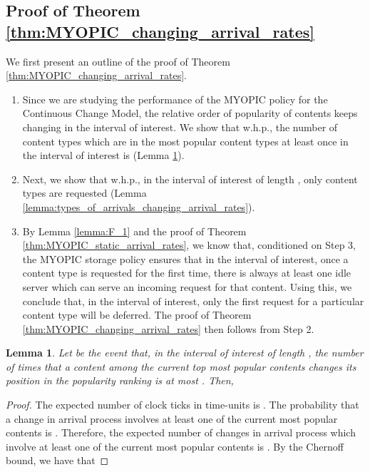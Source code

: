\documentclass[10pt, conference, letterpaper]{IEEEtran}
\newtheorem{lemma}{Lemma}
\begin{document}
\subsection{Proof of Theorem \ref{thm:MYOPIC_changing_arrival_rates}}
\label{sec:proof4}

\noindent We first present an outline of the proof of Theorem \ref{thm:MYOPIC_changing_arrival_rates}. 

\begin{enumerate}
	\item Since we are studying the performance of the MYOPIC policy for the Continuous Change Model, the relative order of popularity of contents keeps changing in the interval of interest. We show that w.h.p., the number of content types which are in the  most popular content types at least once in the interval of interest is  (Lemma \ref{lemma:change_in_heavy_hitters}).
	\item Next, we show that w.h.p., in the interval of interest of length , only  content types are requested (Lemma \ref{lemma:types_of_arrivals_changing_arrival_rates}).
	\item By Lemma \ref{lemma:F_1} and the proof of Theorem \ref{thm:MYOPIC_static_arrival_rates}, we know that, conditioned on Step 3, the MYOPIC storage policy ensures that in the interval of interest, once a content type is requested for the first time, there is always at least one idle server which can serve an incoming request for that content. Using this, we conclude that, in the interval of interest, only the first request for a particular content type will be deferred. The proof of Theorem \ref{thm:MYOPIC_changing_arrival_rates} then follows from Step 2.
\end{enumerate}


\begin{lemma}
	\label{lemma:change_in_heavy_hitters}
	Let  be the event that, in the interval of interest of length , the number of times that a content among the current top  most popular contents changes its position in the popularity ranking is at most . Then, 
\end{lemma}
\begin{proof}
	The expected number of clock ticks in  time-units is . The probability that a change in arrival process involves at least one of the current  most popular contents is . Therefore, the expected number of changes in arrival process which involve at least one of the current  most popular contents is  . By the Chernoff bound, we have that
	
\end{proof}
\end{document}
